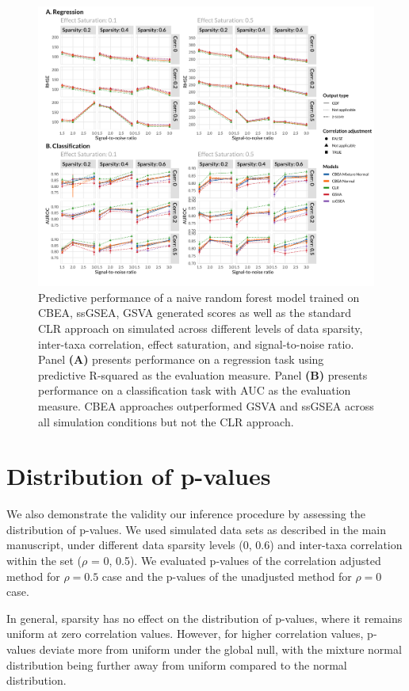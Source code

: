 \begin{figure}[!h]
    \centering
    \includegraphics[width = \linewidth]{figures/sim_pred_combined.png}
    \caption{Predictive performance of a naive random forest model trained on CBEA, ssGSEA, GSVA generated scores as well as the standard CLR approach on simulated across different levels of data sparsity, inter-taxa correlation, effect saturation, and signal-to-noise ratio. Panel \textbf{(A)} presents performance on a regression task using predictive R-squared as the evaluation measure. Panel \textbf{(B)} presents performance on a classification task with AUC as the evaluation measure. CBEA approaches outperformed GSVA and ssGSEA across all simulation conditions but not the CLR approach.}
    \label{fig:6}
\end{figure}

\section{Distribution of p-values}
We also demonstrate the validity our inference procedure by assessing the distribution of p-values. We used simulated data sets as described in the main manuscript, under different data sparsity levels (0, 0.6) and inter-taxa correlation within the set ($\rho$ = 0, 0.5). We evaluated p-values of the correlation adjusted method for $\rho = 0.5$ case and the p-values of the unadjusted method for $\rho = 0$ case.  

In general, sparsity has no effect on the distribution of p-values, where it remains uniform at zero correlation values. However, for higher correlation values, p-values deviate more from uniform under the global null, with the mixture normal distribution being further away from uniform compared to the normal distribution. 

